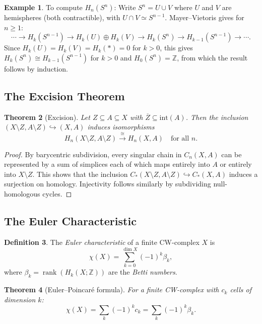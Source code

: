 \documentclass[12pt,a4paper]{amsart}
\newtheorem{theorem}{Theorem}[section]
\theoremstyle{definition}
\newtheorem{definition}[theorem]{Definition}
\newtheorem{example}[theorem]{Example}
\begin{document}
\begin{example}
To compute $H_n(S^n)$: Write $S^n = U \cup V$ where $U$ and $V$ are hemispheres
(both contractible), with $U \cap V \simeq S^{n-1}$.
Mayer--Vietoris gives for $n \geq 1$:
\[
  \cdots \to H_k(S^{n-1}) \to H_k(U) \oplus H_k(V) \to H_k(S^n) \to H_{k-1}(S^{n-1}) \to \cdots.
\]
Since $H_k(U) = H_k(V) = H_k(*) = 0$ for $k > 0$, this gives
$H_k(S^n) \cong H_{k-1}(S^{n-1})$ for $k > 0$ and $H_0(S^n) = \mathbb{Z}$,
from which the result follows by induction.
\end{example}

\subsection{The Excision Theorem}

\begin{theorem}[Excision]
\label{thm:excision}
Let $Z \subseteq A \subseteq X$ with $\overline{Z} \subseteq \mathrm{int}(A)$.
Then the inclusion $(X \setminus Z, A \setminus Z) \hookrightarrow (X, A)$
induces isomorphisms
\[
  H_n(X \setminus Z, A \setminus Z) \xrightarrow{\cong} H_n(X, A)
  \quad \text{for all } n.
\]
\end{theorem}
\begin{proof}
By barycentric subdivision, every singular chain in $C_n(X, A)$ can be
represented by a sum of simplices each of which maps entirely into $A$
or entirely into $X \setminus Z$. This shows that the inclusion
$C_*(X \setminus Z, A \setminus Z) \hookrightarrow C_*(X, A)$
induces a surjection on homology. Injectivity follows similarly by
subdividing null-homologous cycles.
\end{proof}

\subsection{The Euler Characteristic}

\begin{definition}
The \emph{Euler characteristic} of a finite CW-complex $X$ is
\[
  \chi(X) = \sum_{k=0}^{\dim X} (-1)^k \beta_k,
\]
where $\beta_k = \operatorname{rank}(H_k(X;\mathbb{Z}))$ are the
\emph{Betti numbers}.
\end{definition}

\begin{theorem}[Euler--Poincar\'e formula]
For a finite CW-complex with $c_k$ cells of dimension $k$:
\[
  \chi(X) = \sum_k (-1)^k c_k = \sum_k (-1)^k \beta_k.
\]
\end{theorem}
\end{document}
